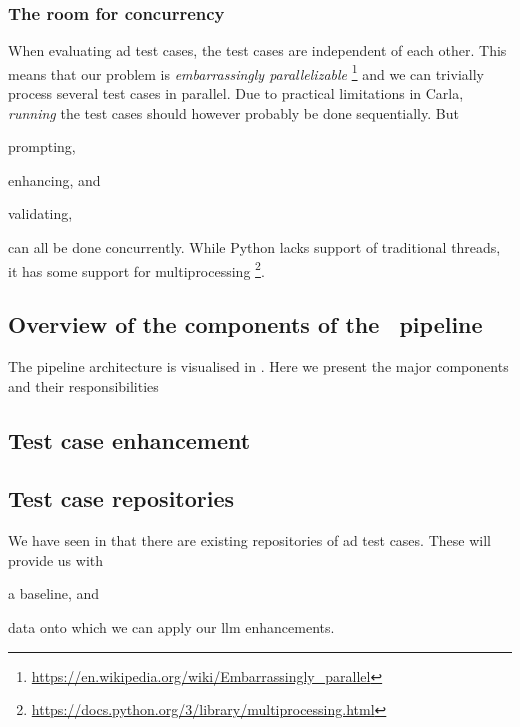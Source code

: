 \subsubsection*{The room for concurrency}

When evaluating \acrshort{ad} test cases, the test cases are independent of each
other. This means that our problem is \textit{embarrassingly parallelizable}
\footnote{\url{https://en.wikipedia.org/wiki/Embarrassingly_parallel}} and we can
trivially process several test cases in parallel. Due to practical limitations
in Carla, \textit{running} the test cases should however probably be done
sequentially. But \begin{inparaenum}
    \item prompting,
    \item enhancing, and
    \item validating,
\end{inparaenum}
can all be done concurrently. While Python lacks support of traditional threads,
it has some support for multiprocessing
\footnote{\url{https://docs.python.org/3/library/multiprocessing.html}}.

\subsection*{Overview of the components of the \hefe~pipeline}

The pipeline architecture is visualised in . Here we
present the major components and their responsibilities


\subsection*{Test case enhancement}

\subsection{Test case repositories}

We have seen in  that there are existing repositories of
\acrshort{ad} test cases. These will provide us with \begin{inparaenum}
    \item a baseline,
    and
    \item data onto which we can apply our \acrshort{llm} enhancements.
\end{inparaenum}

